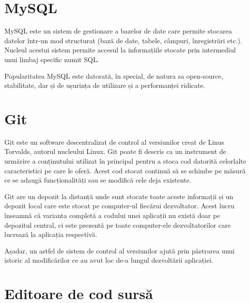 \section{MySQL}

MySQL este un sistem de gestionare a bazelor de date care permite stocarea datelor într-un mod structurat (bază de date, tabele, câmpuri, înregistrări etc.). Nucleul acestui sistem permite accesul la informațiile stocate prin intermediul unui limbaj specific numit SQL.\newline

Popularitatea MySQL este datorată, în special, de natura sa open-source, stabilitate, dar și de ușurința de utilizare și a performanței ridicate.\newline

\section{Git}

Git este un software descentralizat de control al versiunilor creat de Linus Torvalds, autorul nucleului Linux. Git poate fi descris ca un instrument de urmărire a conținutului utilizat în principal pentru a stoca cod datorită celorlalte caracteristici pe care le oferă. Acest cod stocat continuă să se schimbe pe măsură ce se adaugă funcționalități sau se modifică cele deja existente.\newline

Git are un depozit la distanță unde sunt stocate toate aceste informații și un depozit local care este stocat pe computer-ul fiecărui dezvoltator. Acest lucru înseamnă că varianta completă a codului unei aplicații nu există doar pe depozitul central, ci este prezentă pe toate computer-ele dezvoltatorilor care lucrează la aplicația respectivă.\newline

Așadar, un astfel de sistem de control al versiunilor ajută prin păstrarea unui istoric al modificărilor ce au avut loc de-a lungul dezvoltării aplicației.


\section{Editoare de cod sursă}
